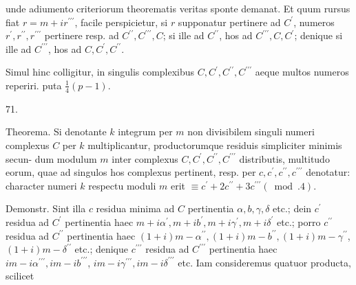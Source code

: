 \documentclass[10pt]{article}
\begin{document}
unde adiumento criteriorum theorematis veritas sponte demanat. Et quum rursus fiat \(r=m+i r^{\prime \prime \prime}\), facile perspicietur, si \(r\) supponatur pertinere ad \(C^{\prime}\), numeros \(r^{\prime}, r^{\prime \prime}, r^{\prime \prime \prime}\) pertinere resp. ad \(C^{\prime \prime}, C^{\prime \prime \prime}, C\); si ille ad \(C^{\prime \prime}\), hos ad \(C^{\prime \prime \prime}, C, C^{\prime}\); denique si ille ad \(C^{\prime \prime \prime}\), hos ad \(C, C^{\prime}, C^{\prime \prime}\).

Simul hinc colligitur, in singulis complexibus \(C, C^{\prime}, C^{\prime \prime}, C^{\prime \prime \prime}\) aeque multos numeros reperiri. puta \(\frac{1}{4}(p-1)\).

71.

Theorema. Si denotante \(k\) integrum per \(m\) non divisibilem singuli numeri complexus \(C\) per \(k\) multiplicantur, productorumque residuis simpliciter minimis secun-
dum modulum \(m\) inter complexus \(C, C^{\prime}, C^{\prime \prime}, C^{\prime \prime \prime}\) distributis, multitudo eorum, quae ad singulos hos complexus pertinent, resp. per \(c, c^{\prime}, c^{\prime \prime}, c^{\prime \prime \prime}\) denotatur: character numeri \(k\) respectu moduli \(m\) erit \(\equiv c^{\prime}+2 c^{\prime \prime}+3 c^{\prime \prime \prime}(\bmod .4)\).

Demonstr. Sint illa \(c\) residua minima ad \(C\) pertinentia \(\alpha, b, \gamma, \delta\) etc.; dein \(c^{\prime}\) residua ad \(C^{\prime}\) pertinentia haec \(m+i \alpha^{\prime}, m+i b^{\prime}, m+i \gamma^{\prime}, m+i \delta^{\prime}\) etc.; porro \(c^{\prime \prime}\) residua ad \(C^{\prime \prime}\) pertinentia haec \((1+i) m-\alpha^{\prime \prime},(1+i) m-b^{\prime \prime},(1+i) m-\gamma^{\prime \prime}\), \((1+i) m-\delta^{\prime \prime}\) etc.; denique \(c^{\prime \prime \prime}\) residua ad \(C^{\prime \prime \prime}\) pertinentia haec \(i m-i \alpha^{\prime \prime \prime}, i m-i b^{\prime \prime \prime}\), \(i m-i \gamma^{\prime \prime \prime}, i m-i \delta^{\prime \prime \prime}\) etc. Iam consideremus quatuor producta, scilicet
\end{document}

